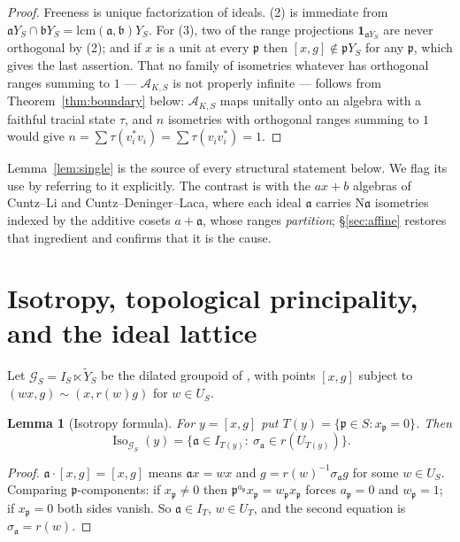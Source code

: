 \documentclass[11pt]{amsart}
\numberwithin{equation}{section}
\newtheorem{lemma}[theorem]{Lemma}
\theoremstyle{definition}
\theoremstyle{remark}
\newcommand{\cA}{\mathcal{A}}
\newcommand{\cG}{\mathcal{G}}
\newcommand{\pp}{\mathfrak{p}}
\newcommand{\aaa}{\mathfrak{a}}
\newcommand{\bb}{\mathfrak{b}}
\newcommand{\Ns}{\mathrm{N}}
\newcommand{\Iso}{\operatorname{Iso}}
\begin{document}
\begin{proof}
Freeness is unique factorization of ideals. (2) is immediate from
$\aaa Y_S\cap\bb Y_S=\mathrm{lcm}(\aaa,\bb)Y_S$. For (3), two of the range projections
$\mathbf 1_{\aaa Y_S}$ are never orthogonal by (2); and if $x$ is a unit at every $\pp$ then
$[x,g]\notin\pp Y_S$ for any $\pp$, which gives the last assertion. That no family of
isometries whatever has orthogonal ranges summing to $1$ --- $\cA_{K,S}$ is not properly
infinite --- follows from Theorem~\ref{thm:boundary} below: $\cA_{K,S}$ maps unitally onto
an algebra with a faithful tracial state $\tau$, and $n$ isometries with orthogonal ranges
summing to $1$ would give $n=\sum\tau(v_i^*v_i)=\sum\tau(v_iv_i^*)=1$.
\end{proof}

Lemma~\ref{lem:single} is the source of every structural statement below. We flag its use
by referring to it explicitly. The contrast is with the $ax+b$ algebras of Cuntz--Li and
Cuntz--Deninger--Laca, where each ideal $\aaa$ carries $\Ns\aaa$ isometries indexed by the
additive cosets $a+\aaa$, whose ranges \emph{partition}; \S\ref{sec:affine} restores that
ingredient and confirms that it is the cause.

\section{Isotropy, topological principality, and the ideal lattice}

Let $\cG_S=I_S\ltimes\widetilde Y_S$ be the dilated groupoid of \cite[Prop.~2.8]{Main},
with points $[x,g]$ subject to $(wx,g)\sim(x,r(w)g)$ for $w\in U_S$.

\begin{lemma}[Isotropy formula]\label{lem:iso}
For $y=[x,g]$ put $T(y)=\{\pp\in S:x_\pp=0\}$. Then
\begin{equation}\label{eq:iso}
\Iso_{\cG_S}(y)=\bigl\{\aaa\in I_{T(y)}:\ \sigma_\aaa\in r(U_{T(y)})\bigr\}.
\end{equation}
\end{lemma}

\begin{proof}
$\aaa\cdot[x,g]=[x,g]$ means $\aaa x=wx$ and $g=r(w)^{-1}\sigma_\aaa g$ for some $w\in U_S$.
Comparing $\pp$-components: if $x_\pp\ne0$ then $\pp^{a_\pp}x_\pp=w_\pp x_\pp$ forces
$a_\pp=0$ and $w_\pp=1$; if $x_\pp=0$ both sides vanish. So $\aaa\in I_T$, $w\in U_T$, and
the second equation is $\sigma_\aaa=r(w)$.
\end{proof}
\end{document}
